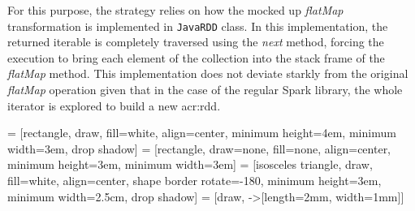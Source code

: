 For this purpose, the strategy relies on how the mocked up \textit{flatMap} transformation is implemented in \texttt{JavaRDD} class. In this implementation, the returned iterable is completely traversed using the \textit{next} method, forcing the execution to bring each element of the collection into the stack frame of the \textit{flatMap} method. This implementation does not deviate starkly from the original \textit{flatMap} operation given that in the case of the regular Spark library, the whole iterator is explored to build a new \acrshort{acr:rdd}.

 = [rectangle, draw, fill=white, align=center, minimum height=4em, minimum width=3em, drop shadow]
 = [rectangle, draw=none, fill=none, align=center, minimum height=3em, minimum width=3em]
 = [isosceles triangle, draw, fill=white, align=center, shape border rotate=-180, minimum height=3em, minimum width=2.5cm, drop shadow]
 = [draw, -{>[length=2mm, width=1mm]}]
